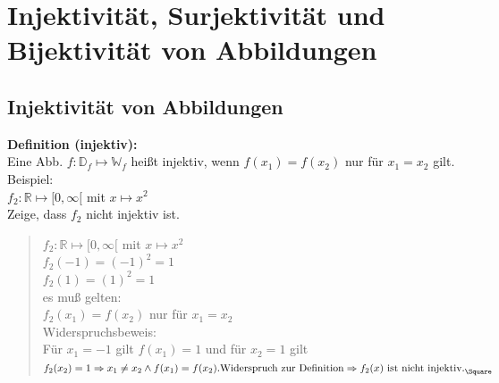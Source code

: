 
\section{Injektivität, Surjektivität und Bijektivität von Abbildungen}

\subsection{Injektivität von Abbildungen}

\textbf{Definition (injektiv):}\\
Eine Abb. $f:\mathbb{D}_f\longmapsto\mathbb{W}_f$ heißt injektiv, wenn $f(x_1)=f(x_2)$ nur für $x_1=x_2$ gilt.\\
Beispiel:\\
$f_2:\mathbb{R}\longmapsto[0,\infty[$ mit $x\longmapsto x^2$\\
\textbullet \;\;Zeige, dass $f_2$ nicht injektiv ist.\\
\begin{quote}
	$f_2:\mathbb{R}\longmapsto [0,\infty[$ mit $x\longmapsto x^2$\\
	$ f_2(-1)=(-1)^2=1$\\
	$f_2(1)=(1)^2=1$\\
	es muß gelten:\\
	$f_2(x_1)=f(x_2)$ nur für $x_1=x_2$\\
	Widerspruchsbeweis:\\
	Für $x_1=-1$ gilt $f(x_1)=1$ und für $x_2=1$ gilt $f_2(x_2)=1\Rightarrow x_1\neq x_2\wedge f(x_1)=f(x_2).\\\text{Widerspruch zur Definition} \Rightarrow f_2(x) \text{ ist nicht injektiv.}_{\Square} $ \\ 
	
\end{quote}

